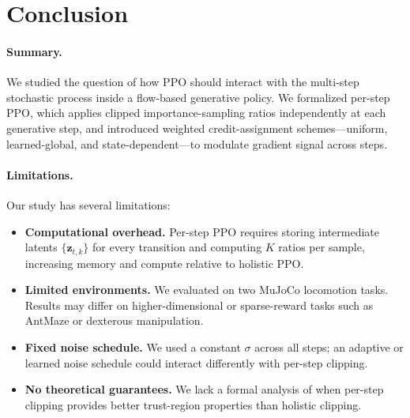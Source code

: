 \section{Conclusion}
\label{sec:conclusion}

\paragraph{Summary.}
We studied the question of how PPO should interact with the multi-step
stochastic process inside a flow-based generative policy.  We formalized
per-step PPO, which applies clipped importance-sampling ratios independently at
each generative step, and introduced weighted credit-assignment schemes---uniform,
learned-global, and state-dependent---to modulate gradient signal across steps.

\paragraph{Limitations.}
Our study has several limitations:
\begin{itemize}[nosep,leftmargin=*]
  \item \textbf{Computational overhead.}  Per-step PPO requires storing
        intermediate latents $\{\mathbf{z}_{t,k}\}$ for every transition and
        computing $K$ ratios per sample, increasing memory and compute relative
        to holistic PPO.
  \item \textbf{Limited environments.}  We evaluated on two MuJoCo locomotion
        tasks.  Results may differ on higher-dimensional or sparse-reward tasks
        such as AntMaze or dexterous manipulation.
  \item \textbf{Fixed noise schedule.}  We used a constant $\sigma$ across all
        steps; an adaptive or learned noise schedule could interact differently
        with per-step clipping.
  \item \textbf{No theoretical guarantees.}  We lack a formal analysis of when
        per-step clipping provides better trust-region properties than holistic
        clipping.
\end{itemize}

